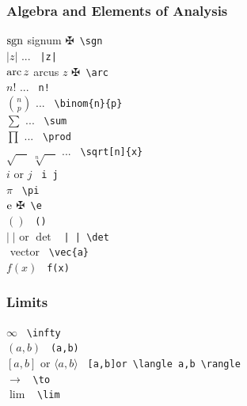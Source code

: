 \subsubsection{Algebra and Elements of Analysis}
\begin{tabbing}
\mySymbols
 $ \mathrm{sgn} $                            \> signum              \>  $\maltese$\verb` \sgn ` \\
 $ |z|$                              \> ...                 \>  \verb` |z| ` \\
 $ \mathrm{arc}\,z$                          \> arcus $z$           \>  $\maltese$\verb` \arc ` \\
 $ n!$                               \> ...                 \>  \verb` n! ` \\
 $ \binom{n}{p}$                     \> ...                 \>  \verb` \binom{n}{p} ` \\
 $ \sum $                            \> ...                 \>  \verb` \sum  ` \\
 $ \prod $                           \> ...                 \>  \verb` \prod ` \\
 $ \sqrt{\quad}\;\sqrt[n]{\quad} $   \> ...                 \>  \verb` \sqrt[n]{x} ` \\
 $i$ or $j$                          \>                     \>  \verb` i j ` \\
 $\pi $                              \>                     \>  \verb` \pi ` \\
 $\mathrm{e} $                               \>                     \>  $\maltese$\verb` \e ` \\
 $()$                                \>                     \>  \verb` () ` \\
 $|\;|$ or $\det$                    \>                     \>  \verb` | | \det` \\
 $ $                          \> vector                    \> \verb` \vec{a} `\\
 $f(x)$                              \>                     \>  \verb` f(x) ` \\
\end{tabbing}

\subsubsection{Limits}
\begin{tabbing}
\mySymbols
 $\infty$                            \>                     \> \verb` \infty `  \\
 $(a,b)$                             \>                     \> \verb` (a,b) `  \\
 ${[a,b]}$ or $\langle a,b \rangle$  \>                     \> \verb` [a,b]or \langle a,b \rangle `  \\
 $\to $                              \>                     \> \verb` \to  `  \\
 $\lim $                             \>                     \> \verb` \lim `  \\
\end{tabbing}

